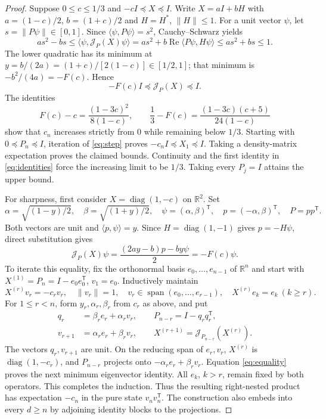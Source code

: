\documentclass[11pt,a4paper]{article}
\newcommand{\Id}{I}
\newcommand{\J}{\mathcal J}
\begin{document}
\begin{proof}
Suppose $0\leq c\leq1/3$ and $-c\Id\preceq X\preceq\Id$.
Write $X=a\Id+bH$ with $a=(1-c)/2$, $b=(1+c)/2$ and
$H=H^*$, $\|H\|\leq1$. For a unit vector $\psi$, let
$s=\|P\psi\|\in[0,1]$. Since $\langle\psi,P\psi\rangle=s^2$,
Cauchy--Schwarz yields
\[
 as^2-bs\leq\langle\psi,\J_P(X)\psi\rangle
 =as^2+b\operatorname{Re}\langle P\psi,H\psi\rangle
 \leq as^2+bs\leq1.
\]
The lower quadratic has its minimum at
$y=b/(2a)=(1+c)/[2(1-c)]\in[1/2,1]$; that minimum is
$-b^2/(4a)=-F(c)$. Hence
\begin{equation}\label{eq:step}
 -F(c)\Id\preceq\J_P(X)\preceq\Id.
\end{equation}
The identities
\begin{equation}\label{eq:identities}
 F(c)-c=\frac{(1-3c)^2}{8(1-c)},\qquad
 \frac13-F(c)=\frac{(1-3c)(c+5)}{24(1-c)}
\end{equation}
show that $c_n$ increases strictly from $0$ while remaining below $1/3$.
Starting with $0\preceq P_n\preceq\Id$, iteration of
\eqref{eq:step} proves $-c_n\Id\preceq X_1\preceq\Id$.
Taking a density-matrix expectation proves the claimed bounds.
Continuity and the first identity in \eqref{eq:identities} force the
increasing limit to be $1/3$. Taking every $P_j=\Id$ attains the upper bound.

For sharpness, first consider $X=\operatorname{diag}(1,-c)$ on
$\mathbb R^2$. Set
\[
 \alpha=\sqrt{(1-y)/2},\quad \beta=\sqrt{(1+y)/2},\quad
 \psi=(\alpha,\beta)^{\mathsf T},\quad
 p=(-\alpha,\beta)^{\mathsf T},\quad P=pp^{\mathsf T}.
\]
Both vectors are unit and $\langle p,\psi\rangle=y$.
Since $H=\operatorname{diag}(1,-1)$ gives $p=-H\psi$, direct substitution
gives
\begin{equation}\label{eq:equality}
 \J_P(X)\psi
 =\frac{(2ay-b)p-by\psi}{2}=-F(c)\psi.
\end{equation}
To iterate this equality, fix the orthonormal basis
$e_0,\ldots,e_{n-1}$ of $\mathbb R^n$ and start with
$X^{(1)}=P_n=\Id-e_0e_0^{\mathsf T}$, $v_1=e_0$.
Inductively maintain
\[
 X^{(r)}v_r=-c_rv_r,\quad \|v_r\|=1,\quad
 v_r\in\operatorname{span}(e_0,\ldots,e_{r-1}),\quad
 X^{(r)}e_k=e_k\ (k\geq r).
\]
For $1\leq r<n$, form $y_r,\alpha_r,\beta_r$ from $c_r$ as above, and put
\begin{equation}\label{eq:construction}
 \begin{split}
 q_r&=\beta_re_r+\alpha_rv_r,\qquad
 P_{n-r}=\Id-q_rq_r^{\mathsf T},\\
 v_{r+1}&=\alpha_re_r+\beta_rv_r,\qquad
 X^{(r+1)}=\J_{P_{n-r}}(X^{(r)}).
 \end{split}
\end{equation}
The vectors $q_r,v_{r+1}$ are unit. On the reducing span of $e_r,v_r$,
$X^{(r)}$ is $\operatorname{diag}(1,-c_r)$, and $P_{n-r}$ projects onto
$-\alpha_re_r+\beta_rv_r$. Equation \eqref{eq:equality} proves the next
minimum eigenvector identity. All $e_k$, $k>r$, remain fixed by both
operators. This completes the induction. Thus the resulting right-nested
product has expectation $-c_n$ in the pure state $v_nv_n^{\mathsf T}$.
The construction also embeds into every $d\geq n$ by adjoining identity
blocks to the projections.


\end{proof}
\end{document}
